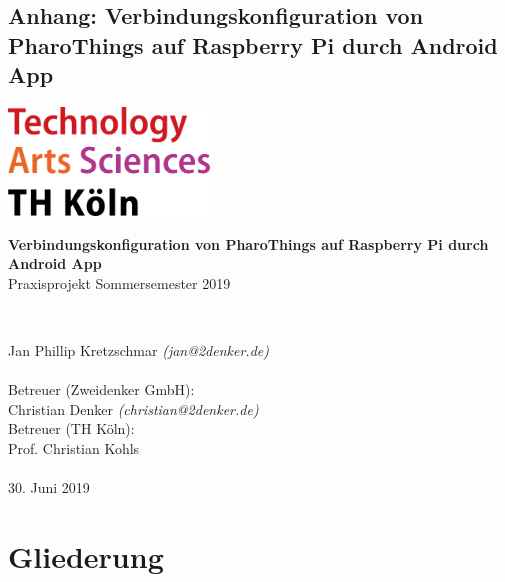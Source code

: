 \documentclass[12pt,a4paper]{article}
\renewcommand{\contentsname}{Gliederung}
\begin{document}
    \startcontents[sections]
    \begin{titlepage}
    \section{Anhang: Verbindungskonfiguration von PharoThings auf Raspberry Pi durch Android App}
    \includegraphics[width=0.4\textwidth]{../latex-ai-project/th_logo.png}
    ~\\[2.5cm]
    \begin{center}
    \textbf{\huge Verbindungskonfiguration von PharoThings auf Raspberry Pi durch Android App}\\[0.5cm]
    {\Large Praxisprojekt Sommersemester 2019}
    \vfill
    \end{center}
    ~\\[2.0cm]
    \begin{flushright}
    {\large Jan Phillip Kretzschmar \it{(jan@2denker.de)}}\\[0.1cm]
    ~\\[1.0cm]
    {\large Betreuer (Zweidenker GmbH):}\\[0.1cm]
    {\large Christian Denker \it{(christian@2denker.de)}}
    ~\\[0.5cm]
    {\large Betreuer (TH Köln):}\\[0.1cm]
    {\large Prof. Christian Kohls}\\[0.1cm]

	~\\[1.0cm]
    {\large 30. Juni 2019}
	\end{flushright}
    \end{titlepage}

    \pagebreak
    \section*{\contentsname}
    \pagebreak
\end{document}
